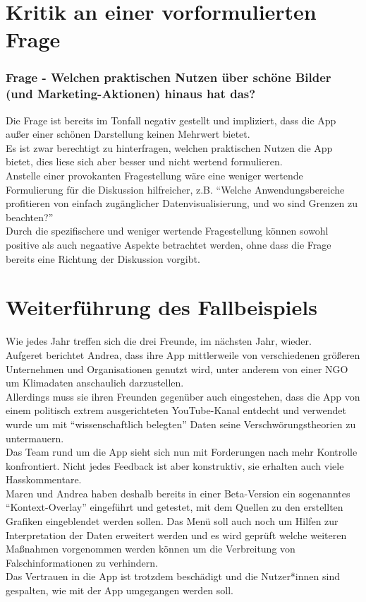 \documentclass[12pt]{article}
\begin{document}
\pagebreak

\section{Kritik an einer vorformulierten Frage}

\subsubsection*{Frage - Welchen praktischen Nutzen über schöne Bilder (und Marketing-Aktionen) hinaus hat das?}

Die Frage ist bereits im Tonfall negativ gestellt und impliziert, dass die App außer einer schönen Darstellung keinen Mehrwert bietet.\\
Es ist zwar berechtigt zu hinterfragen, welchen praktischen Nutzen die App bietet, dies liese sich aber besser und nicht wertend formulieren.\\
Anstelle einer provokanten Fragestellung wäre eine weniger wertende Formulierung für die Diskussion hilfreicher, z.B. ``Welche Anwendungsbereiche profitieren von einfach zugänglicher Datenvisualisierung, und wo sind Grenzen zu beachten?''\\
Durch die spezifischere und weniger wertende Fragestellung können sowohl positive als auch negaative Aspekte betrachtet werden, ohne dass die Frage bereits eine Richtung der Diskussion vorgibt.

\pagebreak

\section{Weiterführung des Fallbeispiels}

Wie jedes Jahr treffen sich die drei Freunde, im nächsten Jahr, wieder.\\
Aufgeret berichtet Andrea, dass ihre App mittlerweile von verschiedenen größeren Unternehmen und Organisationen genutzt wird, unter anderem von einer NGO um Klimadaten anschaulich darzustellen.\\
Allerdings muss sie ihren Freunden gegenüber auch eingestehen, dass die App von einem politisch extrem ausgerichteten YouTube-Kanal entdecht und verwendet wurde um mit ``wissenschaftlich belegten'' Daten seine Verschwörungstheorien zu untermauern.\\
Das Team rund um die App sieht sich nun mit Forderungen nach mehr Kontrolle konfrontiert. Nicht jedes Feedback ist aber konstruktiv, sie erhalten auch viele Hasskommentare.\\
Maren und Andrea haben deshalb bereits in einer Beta-Version ein sogenanntes ``Kontext-Overlay'' eingeführt und getestet, mit dem Quellen zu den erstellten Grafiken eingeblendet werden sollen. Das Menü soll auch noch um Hilfen zur Interpretation der Daten erweitert werden und es wird geprüft welche weiteren Maßnahmen vorgenommen werden können um die Verbreitung von Falschinformationen zu verhindern.\\
Das Vertrauen in die App ist trotzdem beschädigt und die Nutzer*innen sind gespalten, wie mit der App umgegangen werden soll.
\end{document}

